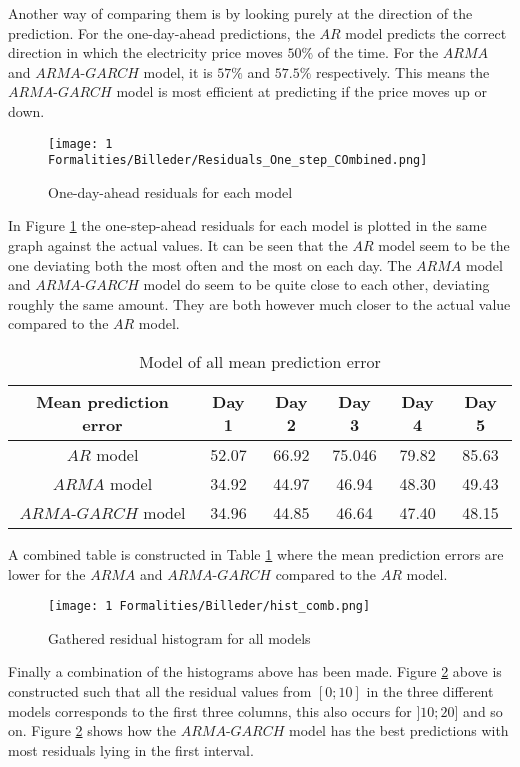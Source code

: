 Another way of comparing them is by looking purely at the direction of the prediction. For the one-day-ahead predictions, the $AR$ model predicts the correct direction in which the electricity price moves $50\%$ of the time. For the $ARMA$ and $ARMA$-$GARCH$ model, it is $57\%$ and $57.5\%$ respectively. This means the $ARMA$-$GARCH$ model is most efficient at predicting if the price moves up or down.
\begin{figure}[H]
    \centering
    \texttt{[image: 1 Formalities/Billeder/Residuals\_One\_step\_COmbined.png]}
    \caption{One-day-ahead residuals for each model}
    \label{fig:Residuals_One_step_Combined}
\end{figure}
\noindent In Figure \ref{fig:Residuals_One_step_Combined} the one-step-ahead residuals for each model is plotted in the same graph against the actual values. It can be seen that the $AR$ model seem to be the one deviating both the most often and the most on each day. The $ARMA$ model and $ARMA$-$GARCH$ model do seem to be quite close to each other, deviating roughly the same amount. They are both however much closer to the actual value compared to the $AR$ model. 

\begin{table}[H]
    \centering
  \begin{tabular}{|c|c|c|c|c|c|}
    \hline
   Mean prediction error & Day 1 & Day 2 & Day 3 & Day 4 & Day 5 \\
    \hline
    $AR$ model& 52.07 & 66.92 & 75.046 & 79.82 & 85.63   \\
    \hline
   $ARMA$ model& 34.92 & 44.97 & 46.94 & 48.30 & 49.43  \\
    \hline
    $ARMA$-$GARCH$ model & 34.96 & 44.85 & 46.64 & 47.40 & 48.15  \\
    \hline
  \end{tabular}
  \caption{Model of all mean prediction error}
\label{tab:combi_mean_prediction_error}
\end{table}
\noindent A combined table is constructed in Table \ref{tab:combi_mean_prediction_error} where the mean prediction errors are lower for the $ARMA$ and $ARMA$-$GARCH$ compared to the $AR$ model.
\begin{figure}[H]
    \centering
    \texttt{[image: 1 Formalities/Billeder/hist\_comb.png]}
    \caption{Gathered residual histogram for all models} \label{fig:Histogram_residuals_combi_model}
\end{figure}
\noindent Finally a combination of the histograms above has been made. Figure \ref{fig:Histogram_residuals_combi_model} above is constructed such that all the residual values from $[0;10]$ in the three different models corresponds to the first three columns, this also occurs for $]10;20]$ and so on. Figure \ref{fig:Histogram_residuals_combi_model} shows how the $ARMA$-$GARCH$ model has the best predictions with most residuals lying in the first interval.
